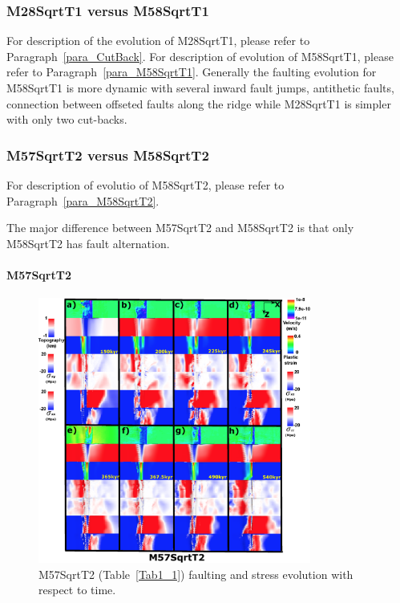 \subsubsection{M28SqrtT1 versus M58SqrtT1}

For description of the evolution of M28SqrtT1, please refer to Paragraph~\hyperref[para_CutBack]{\ref{para_CutBack}}. For description of evolution of M58SqrtT1, please refer to Paragraph~\hyperref[para_M58SqrtT1]{\ref{para_M58SqrtT1}}. Generally the faulting evolution for M58SqrtT1 is more dynamic with several inward fault jumps, antithetic faults, connection between offseted faults along the ridge while M28SqrtT1 is simpler with only two cut-backs.

\subsubsection{M57SqrtT2 versus M58SqrtT2}

For description of evolutio of M58SqrtT2, please refer to Paragraph~\hyperref[para_M58SqrtT2]{\ref{para_M58SqrtT2}}.

The major difference between M57SqrtT2 and M58SqrtT2 is that only M58SqrtT2 has fault alternation.

\paragraph{M57SqrtT2}

\begin{figure}[h]
 \centering
  \includegraphics[width=0.8\textwidth]{./Figures/fig_Results_MRange_3_M57SqrtT2_time_evolution.eps}
 \caption{M57SqrtT2 (Table~\hyperref[Tab1_1]{\ref{Tab1_1}}) faulting and stress evolution with respect to time.}
\label{fig_Results_MRange_3}
\end{figure}


